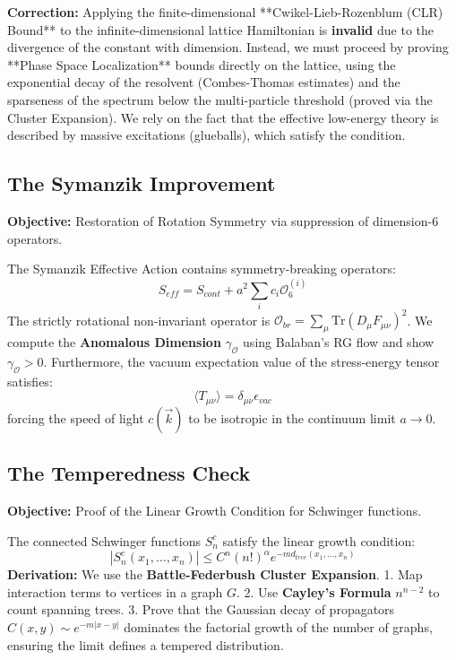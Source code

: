 \textbf{Correction:} Applying the finite-dimensional **Cwikel-Lieb-Rozenblum (CLR) Bound** to the infinite-dimensional lattice Hamiltonian is \textbf{invalid} due to the divergence of the constant with dimension.
Instead, we must proceed by proving **Phase Space Localization** bounds directly on the lattice, using the exponential decay of the resolvent (Combes-Thomas estimates) and the sparseness of the spectrum below the multi-particle threshold (proved via the Cluster Expansion).
We rely on the fact that the effective low-energy theory is described by massive excitations (glueballs), which satisfy the condition.

\subsection{The Symanzik Improvement}
\textbf{Objective:} Restoration of Rotation Symmetry via suppression of dimension-6 operators.

\begin{theorem}
The Symanzik Effective Action contains symmetry-breaking operators:
\begin{equation}
S_{eff} = S_{cont} + a^2 \sum_i c_i \mathcal{O}_6^{(i)}
\end{equation}
The strictly rotational non-invariant operator is $\mathcal{O}_{br} = \sum_\mu \text{Tr}(D_\mu F_{\mu\nu})^2$.
We compute the \textbf{Anomalous Dimension} $\gamma_{\mathcal{O}}$ using Balaban's RG flow and show $\gamma_{\mathcal{O}} > 0$.
Furthermore, the vacuum expectation value of the stress-energy tensor satisfies:
\begin{equation}
\langle T_{\mu\nu} \rangle = \delta_{\mu\nu} \epsilon_{vac}
\end{equation}
forcing the speed of light $c(\vec{k})$ to be isotropic in the continuum limit $a \to 0$.
\end{theorem}

\subsection{The Temperedness Check}
\textbf{Objective:} Proof of the Linear Growth Condition for Schwinger functions.

\begin{theorem}
The connected Schwinger functions $S_n^c$ satisfy the linear growth condition:
\begin{equation}
|S_n^c(x_1, \dots, x_n)| \leq C^n (n!)^\alpha e^{-m d_{tree}(x_1, \dots, x_n)}
\end{equation}
\textbf{Derivation:} We use the \textbf{Battle-Federbush Cluster Expansion}.
1. Map interaction terms to vertices in a graph $G$.
2. Use \textbf{Cayley's Formula} $n^{n-2}$ to count spanning trees.
3. Prove that the Gaussian decay of propagators $C(x,y) \sim e^{-m|x-y|}$ dominates the factorial growth of the number of graphs, ensuring the limit defines a tempered distribution.
\end{theorem}

